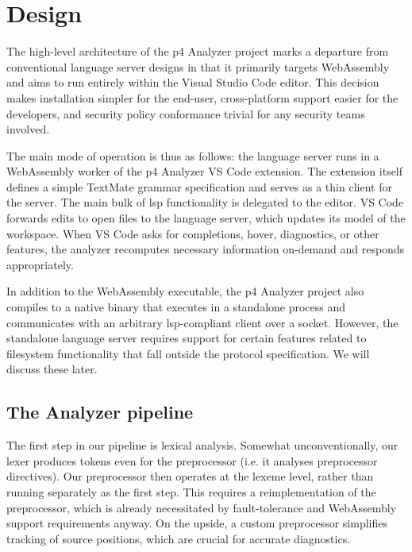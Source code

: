 \chapter{Design} \label{ch:design}

The high-level architecture of the \acrshort{p4} Analyzer project marks a
departure from conventional language server designs in that it primarily targets
WebAssembly and aims to run entirely within the Visual Studio Code editor. This
decision makes installation simpler for the end-user, cross-platform support
easier for the developers, and security policy conformance trivial for any
security teams involved.

The main mode of operation is thus as follows: the language server runs in a
WebAssembly worker of the \acrshort{p4} Analyzer VS Code extension. The
extension itself defines a simple TextMate\cite{textmate} grammar specification
and serves as a thin client for the server. The main bulk of \acrshort{lsp}
functionality is delegated to the editor. VS Code forwards edits to open files
to the language server, which updates its model of the workspace. When VS Code
asks for completions, hover, diagnostics, or other features, the analyzer
recomputes necessary information on-demand and responds appropriately.

In addition to the WebAssembly executable, the \acrshort{p4} Analyzer project
also compiles to a native binary that executes in a standalone process and
communicates with an arbitrary \acrshort{lsp}-compliant client over a socket.
However, the standalone language server requires support for certain features
related to filesystem functionality that fall outside the protocol
specification. We will discuss these later.

\section{The  Analyzer pipeline}

The first step in our pipeline is lexical analysis. Somewhat unconventionally,
our lexer produces tokens even for the preprocessor (i.e. it analyses
preprocessor directives). Our preprocessor then operates at the lexeme level,
rather than running separately as the first step. This requires a
reimplementation of the preprocessor, which is already necessitated by
fault-tolerance and WebAssembly support requirements anyway. On the upside, a
custom preprocessor simplifies tracking of source positions, which are crucial
for accurate diagnostics.

